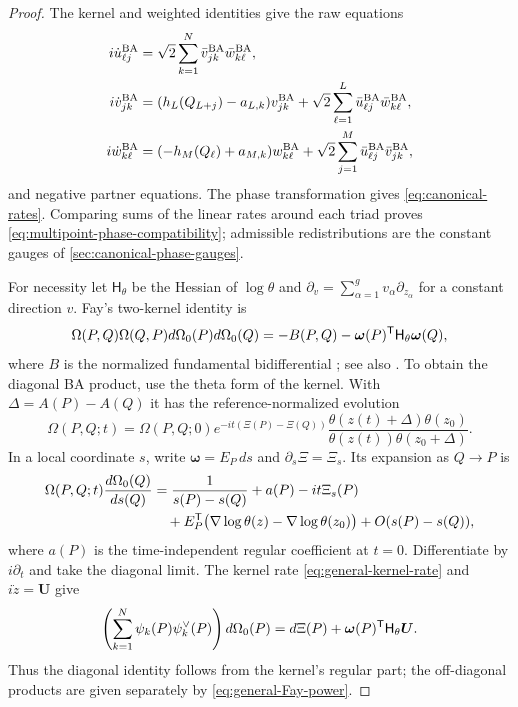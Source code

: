 \begin{proof}
The kernel and weighted identities give the raw equations
\begin{equation}\label{eq:multipoint-raw-rates}
\begin{aligned}
 i\dot u_{\ell j}^{\rm BA}&=\sqrt2\sum_{k=1}^{N}\bar v_{jk}^{\rm BA}\bar w_{k\ell}^{\rm BA},\\
 i\dot v_{jk}^{\rm BA}&=(h_L(Q_{L+j})-a_{L,k})v_{jk}^{\rm BA}
              +\sqrt2\sum_{\ell=1}^{L}\bar u_{\ell j}^{\rm BA}\bar w_{k\ell}^{\rm BA},\\
 i\dot w_{k\ell}^{\rm BA}&=(-h_M(Q_{\ell})+a_{M,k})w_{k\ell}^{\rm BA}
              +\sqrt2\sum_{j=1}^{M}\bar u_{\ell j}^{\rm BA}\bar v_{jk}^{\rm BA},
\end{aligned}
\end{equation}
and negative partner equations. The phase transformation gives
\cref{eq:canonical-rates}. Comparing sums of the linear rates around
each triad proves \cref{eq:multipoint-phase-compatibility}; admissible
redistributions are the constant gauges of \cref{sec:canonical-phase-gauges}.

For necessity let $\mathsf H_\theta$ be the Hessian of $\log\theta$
and $\partial_v=\sum_{\alpha=1}^{g}v_\alpha\partial_{z_\alpha}$
for a constant direction $v$.
Fay's two-kernel identity is
\begin{equation}\label{eq:general-Fay-power}
 \Omega(P,Q)\Omega(Q,P)d\Omega_0(P)d\Omega_0(Q)
 =-B(P,Q)-\boldsymbol\omega(P)^{\mathsf T}\mathsf H_\theta\boldsymbol\omega(Q),
\end{equation}
where $B$ is the normalized fundamental bidifferential
\cite[p.~26]{Fay1973}; see also \cite[(3.12)]{Korotkin2003}.
To obtain the diagonal BA product, use the theta form of the kernel.
With $\Delta=A(P)-A(Q)$ it has the reference-normalized evolution
\[
 \Omega(P,Q;t)=\Omega(P,Q;0)e^{-it(\Xi(P)-\Xi(Q))}
 \frac{\theta(z(t)+\Delta)\theta(z_0)}
      {\theta(z(t))\theta(z_0+\Delta)}.
\]
In a local coordinate $s$, write $\boldsymbol\omega=E_P\,ds$ and
$\partial_s\Xi=\Xi_s$. Its expansion as $Q\to P$ is
\[
\begin{aligned}
 \Omega(P,Q;t)\frac{d\Omega_0(Q)}{ds(Q)}
 &=\frac1{s(P)-s(Q)}+a(P)-it\Xi_s(P)\\
 &\quad+E_P^{\mathsf T}\bigl(\nabla\log\theta(z)-\nabla\log\theta(z_0)\bigr)
 +O(s(P)-s(Q)),
\end{aligned}
\]
where $a(P)$ is the time-independent regular coefficient at $t=0$.
Differentiate by $i\partial_t$ and take the diagonal limit.
The kernel rate \cref{eq:general-kernel-rate} and
$i\dot z=\boldsymbol U$ give
\begin{equation}\label{eq:general-elementary-power}
 \left(\sum_{k=1}^{N}\psi_k(P)\psi_k^\vee(P)\right)d\Omega_0(P)
 =d\Xi(P)+\boldsymbol\omega(P)^{\mathsf T}\mathsf H_\theta\boldsymbol U.
\end{equation}
Thus the diagonal identity follows from the kernel's regular part;
the off-diagonal products are given separately by
\cref{eq:general-Fay-power}.


\end{proof}
